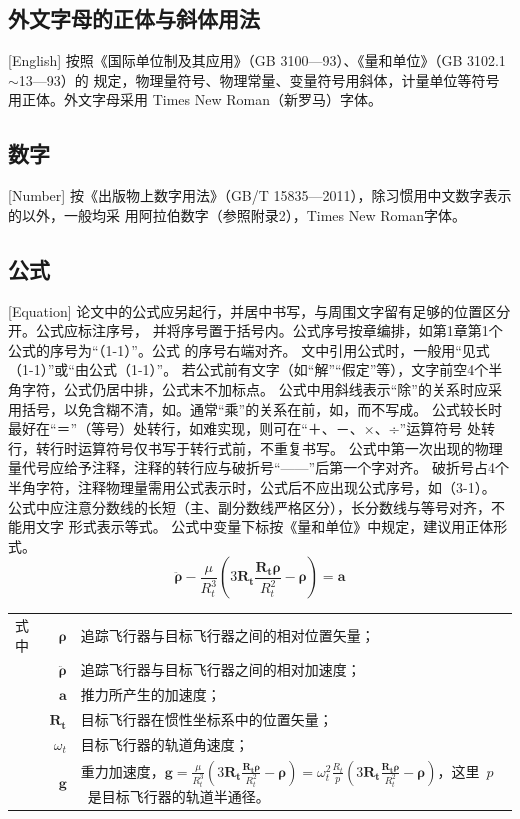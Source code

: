 \subsection{外文字母的正体与斜体用法}[English]
按照《国际单位制及其应用》（GB 3100—93）、《量和单位》（GB 3102.1$\sim$13—93）的
规定，物理量符号、物理常量、变量符号用斜体，计量单位等符号用正体。外文字母采用
Times New Roman（新罗马）字体。

\subsection{数字}[Number]
按《出版物上数字用法》（GB/T 15835—2011），除习惯用中文数字表示的以外，一般均采
用阿拉伯数字（参照附录2），Times New Roman字体。

\subsection{公式}[Equation]
论文中的公式应另起行，并居中书写，与周围文字留有足够的位置区分开。公式应标注序号，
并将序号置于括号内。公式序号按章编排，如第1章第1个公式的序号为“（1-1）”。公式
的序号右端对齐。
文中引用公式时，一般用“见式（1-1）”或“由公式（1-1）”。
若公式前有文字（如“解”“假定”等），文字前空4个半角字符，公式仍居中排，公式末不加标点。
公式中用斜线表示“除”的关系时应采用括号，以免含糊不清，如。通常“乘”的关系在前，如，而不写成。
公式较长时最好在“＝”（等号）处转行，如难实现，则可在“＋、－、×、÷”运算符号
处转行，转行时运算符号仅书写于转行式前，不重复书写。
公式中第一次出现的物理量代号应给予注释，注释的转行应与破折号“——”后第一个字对齐。
破折号占4个半角字符，注释物理量需用公式表示时，公式后不应出现公式序号，如（3-1）。
公式中应注意分数线的长短（主、副分数线严格区分），长分数线与等号对齐，不能用文字
形式表示等式。
公式中变量下标按《量和单位》中规定，建议用正体形式。
\begin{equation}\label{eq:2}
  \ddot{\boldsymbol{\rho}}-\frac{\mu}{R_{t}^{3}}\left(3\mathbf{R_{t}}\frac{\mathbf{R_{t}\rho}}{R_{t}^{2}}-\boldsymbol{\rho}\right)=\mathbf{a}
\end{equation}
\begin{tabularx}{\textwidth}{@{}l@{\quad}r@{———}X@{}}
  式中& $\boldsymbol{\rho}$ &追踪飞行器与目标飞行器之间的相对位置矢量；\\
      &  $\boldsymbol{\ddot{\rho}}$&追踪飞行器与目标飞行器之间的相对加速度；\\
      &  $\mathbf{a}$   &推力所产生的加速度；\\
      &  $\mathbf{R_t}$ & 目标飞行器在惯性坐标系中的位置矢量；\\
      &  $\omega_{t}$ & 目标飞行器的轨道角速度；\\
      &  $\mathbf{g}$ & 重力加速度，$\mathbf{g}=\frac{\mu}{R_{t}^{3}}\left(
                        3\mathbf{R_{t}}\frac{\mathbf{R_{t}\rho}}{R_{t}^{2}}-\boldsymbol{\rho}\right)=\omega_{t}^{2}\frac{R_{t}}{p}\left(
                        3\mathbf{R_{t}}\frac{\mathbf{R_{t}\rho}}{R_{t}^{2}}-\boldsymbol{\rho}\right)$，这里~$p$~是目标飞行器的轨道半通径。
\end{tabularx}\vspace{\ccwd}

